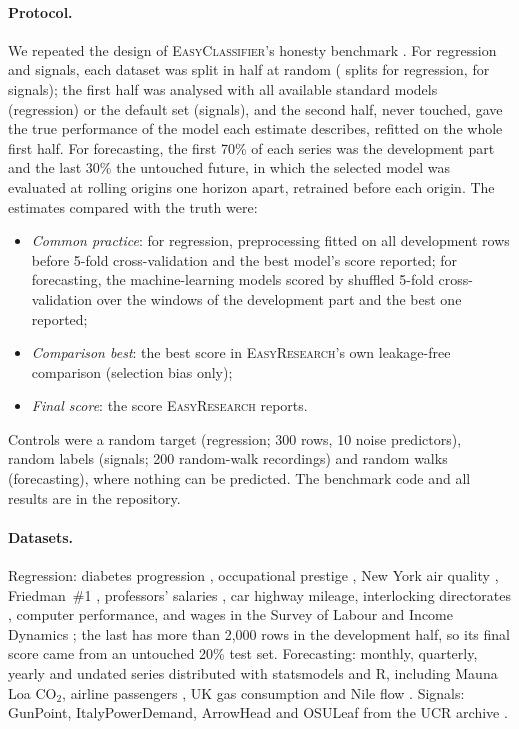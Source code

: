 \documentclass[11pt,a4paper]{article}
\newcommand{\ER}{\textsc{EasyResearch}}
\newcommand{\EC}{\textsc{EasyClassifier}}
\begin{document}
\paragraph{Protocol.} We repeated the design of \EC's honesty benchmark \citep{hassanat2026easyclassifierpaper}. For regression and signals, each dataset was split in half at random (\RegSeeds{} splits for regression, \SigSeeds{} for signals); the first half was analysed with all available standard models (regression) or the default set (signals), and the second half, never touched, gave the true performance of the model each estimate describes, refitted on the whole first half. For forecasting, the first 70\% of each series was the development part and the last 30\% the untouched future, in which the selected model was evaluated at rolling origins one horizon apart, retrained before each origin. The estimates compared with the truth were:
\begin{itemize}
  \item \emph{Common practice}: for regression, preprocessing fitted on all development rows before 5-fold cross-validation and the best model's score reported; for forecasting, the machine-learning models scored by shuffled 5-fold cross-validation over the windows of the development part and the best one reported;
  \item \emph{Comparison best}: the best score in \ER's own leakage-free comparison (selection bias only);
  \item \emph{Final score}: the score \ER{} reports.
\end{itemize}
Controls were a random target (regression; 300 rows, 10 noise predictors), random labels (signals; 200 random-walk recordings) and \FcRWn{} random walks (forecasting), where nothing can be predicted. The benchmark code and all results are in the repository.

\paragraph{Datasets.} Regression: diabetes progression \citep{efron2004lars}, occupational prestige \citep{fox2011car}, New York air quality \citep{chambers1983graphical}, Friedman~\#1 \citep{friedman1991mars}, professors' salaries \citep{fox2011car}, car highway mileage, interlocking directorates \citep{fox2011car}, computer performance, and wages in the Survey of Labour and Income Dynamics \citep{fox2011car}; the last has more than 2{,}000 rows in the development half, so its final score came from an untouched 20\% test set. Forecasting: \FcNData{} monthly, quarterly, yearly and undated series distributed with statsmodels and R, including Mauna Loa CO$_2$, airline passengers \citep{box1976}, UK gas consumption \citep{durbin2001} and Nile flow \citep{cobb1978nile}. Signals: GunPoint, ItalyPowerDemand, ArrowHead and OSULeaf from the UCR archive \citep{dau2019ucr}.
\end{document}
